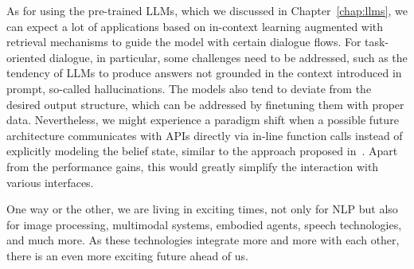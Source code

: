 As for using the pre-trained LLMs, which we discussed in Chapter~\ref{chap:llms},
we can expect a lot of applications based on in-context learning augmented with retrieval mechanisms to guide the model with certain dialogue flows.
For task-oriented dialogue, in particular, some challenges need to be addressed, such as the tendency of LLMs to produce answers not grounded in the context introduced in prompt, so-called hallucinations.
The models also tend to deviate from the desired output structure, which can be addressed by finetuning them with proper data.
Nevertheless, we might experience a paradigm shift when a possible future architecture communicates with APIs directly via in-line function calls instead of explicitly modeling the belief state, similar to the approach proposed in~\cite{schick2023toolformer}.
Apart from the performance gains, this would greatly simplify the interaction with various interfaces.

One way or the other, we are living in exciting times, not only for NLP but also for image processing, multimodal systems, embodied agents, speech technologies, and much more.
As these technologies integrate more and more with each other, there is an even more exciting future ahead of us.
